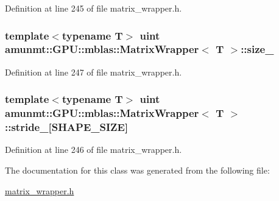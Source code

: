 Definition at line 245 of file matrix\+\_\+wrapper.\+h.

\subsubsection[{\texorpdfstring{size\+\_\+}{size_}}]{\setlength{\rightskip}{0pt plus 5cm}template$<$typename T$>$ uint {\bf amunmt\+::\+G\+P\+U\+::mblas\+::\+Matrix\+Wrapper}$<$ T $>$\+::size\+\_\+\hspace{0.3cm}{\ttfamily [protected]}}\hypertarget{classamunmt_1_1GPU_1_1mblas_1_1MatrixWrapper_a0129d0e6411ab44f357899527a9de65d}{}\label{classamunmt_1_1GPU_1_1mblas_1_1MatrixWrapper_a0129d0e6411ab44f357899527a9de65d}


Definition at line 247 of file matrix\+\_\+wrapper.\+h.

\subsubsection[{\texorpdfstring{stride\+\_\+}{stride_}}]{\setlength{\rightskip}{0pt plus 5cm}template$<$typename T$>$ uint {\bf amunmt\+::\+G\+P\+U\+::mblas\+::\+Matrix\+Wrapper}$<$ T $>$\+::stride\+\_\+\mbox{[}{\bf S\+H\+A\+P\+E\+\_\+\+S\+I\+ZE}\mbox{]}\hspace{0.3cm}{\ttfamily [protected]}}\hypertarget{classamunmt_1_1GPU_1_1mblas_1_1MatrixWrapper_a6dabb13853d38e442864ffa313367758}{}\label{classamunmt_1_1GPU_1_1mblas_1_1MatrixWrapper_a6dabb13853d38e442864ffa313367758}


Definition at line 246 of file matrix\+\_\+wrapper.\+h.



The documentation for this class was generated from the following file\+:\begin{DoxyCompactItemize}
\item 
\hyperlink{matrix__wrapper_8h}{matrix\+\_\+wrapper.\+h}\end{DoxyCompactItemize}
